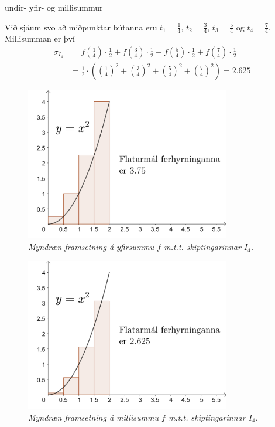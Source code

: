 \begin{syn}{undir- yfir- og millisummur}
\vspace{2mm}

Við sjáum svo að miðpunktar bútanna eru $t_{1} = \frac{1}{4}$, $t_{2} = \frac{3}{4}$, $t_{3} = \frac{5}{4}$ og $t_{4} = \frac{7}{4}$. Millisumman er því
\begin{align*}
\sigma_{I_{4}} &= f\left(\frac{1}{4}\right)\cdot\frac{1}{2}+f\left(\frac{3}{4}\right)\cdot\frac{1}{2}+f\left(\frac{5}{4}\right)\cdot\frac{1}{2}+f\left(\frac{7}{4}\right)\cdot\frac{1}{2}\\ &= \frac{1}{2}\cdot\left(\left(\frac{1}{4}\right)^{2}+\left(\frac{3}{4}\right)^{2}+\left(\frac{5}{4}\right)^{2}+\left(\frac{7}{4}\right)^{2}\right) = 2.625
\end{align*}

\newpage

\begin{figure}[H]
\center
\includegraphics[width=0.8\textwidth]{Pictures/k2m3.png}
\caption{\it Myndræn framsetning á yfirsummu $f$ m.t.t. skiptingarinnar $I_4$.}
\end{figure}

\begin{figure}[H]
\center
\includegraphics[width=0.8\textwidth]{Pictures/k2m4.png}
\caption{\it Myndræn framsetning á millisummu $f$ m.t.t. skiptingarinnar $I_4$.}
\end{figure}

\end{syn}

